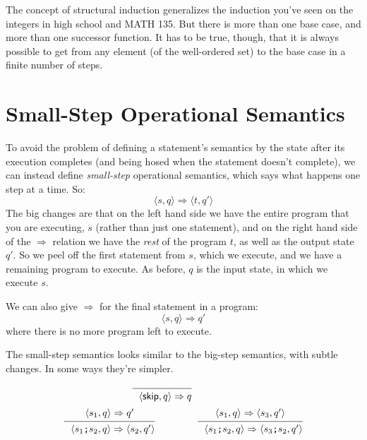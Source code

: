 \documentclass[11pt]{article}
\begin{document}
The concept of structural induction generalizes the induction you've seen on the integers in high school and MATH 135. But there is more than one base case, and more than one successor function. It has to be true, though, that it is always possible to get from any element (of the well-ordered set) to the base case in a finite number of steps.

\section*{Small-Step Operational Semantics}
To avoid the problem of defining a statement's semantics by the state after its execution completes (and being hosed when the statement doesn't complete), we can instead define \emph{small-step} operational semantics, which says what happens one step at a time. So:
\[ \langle s, q \rangle \Rightarrow \langle t, q' \rangle \]
The big changes are that on the left hand side we have the entire program that you are executing, $s$ (rather than just one statement), and on the right hand side of the $\Rightarrow$ relation we have the \emph{rest} of the program $t$, as well as the output state $q'$. So we peel off the first statement from $s$, which we execute, and we have a remaining program to execute. As before, $q$ is the input state, in which we execute $s$.

We can also give $\Rightarrow$ for the final statement in a program:
\[ \langle s, q\rangle \Rightarrow q' \]
where there is no more program left to execute.

The small-step semantics looks similar to the big-step semantics, with subtle changes. In some ways they're simpler.

  \[
  \begin{prooftree}
  \infer0{~~\langle \textsf{skip}, q \rangle \Rightarrow q}
  \end{prooftree}  \hspace*{4em} \
  \]
\[
  \begin{prooftree}
    \hypo{\langle s_1, q \rangle \Rightarrow q'}
  \infer1{~~\langle s_1 \texttt{;} s_2, q \rangle \Rightarrow \langle s_2, q' \rangle}
  \end{prooftree}  \hspace*{4em} \
  \begin{prooftree}
    \hypo{\langle s_1, q \rangle \Rightarrow \langle s_3, q' \rangle}
  \infer1{~~\langle s_1 \texttt{;} s_2, q \rangle \Rightarrow \langle s_3 \texttt{;} s_2, q' \rangle}
  \end{prooftree}
  \]
\end{document}
